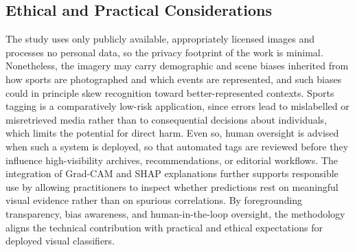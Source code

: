 \subsection{Ethical and Practical Considerations}
\label{subsec:method-ethics}

The study uses only publicly available, appropriately licensed images and processes no personal data, so the privacy footprint of the work is minimal.
Nonetheless, the imagery may carry demographic and scene biases inherited from how sports are photographed and which events are represented, and such biases could in principle skew recognition toward better-represented contexts.
Sports tagging is a comparatively low-risk application, since errors lead to mislabelled or misretrieved media rather than to consequential decisions about individuals, which limits the potential for direct harm.
Even so, human oversight is advised when such a system is deployed, so that automated tags are reviewed before they influence high-visibility archives, recommendations, or editorial workflows.
The integration of Grad-CAM and SHAP explanations further supports responsible use by allowing practitioners to inspect whether predictions rest on meaningful visual evidence rather than on spurious correlations.
By foregrounding transparency, bias awareness, and human-in-the-loop oversight, the methodology aligns the technical contribution with practical and ethical expectations for deployed visual classifiers.
